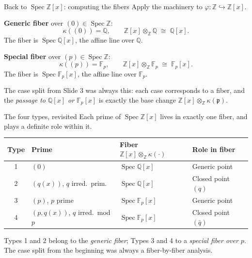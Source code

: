 \documentclass[aspectratio=169,12pt]{beamer}
\begin{document}
\begin{frame}{Back to $\operatorname{Spec}\mathbb{Z}[x]$: computing the fibers}
  Apply the machinery to $\varphi : \mathbb{Z} \hookrightarrow \mathbb{Z}[x]$.

  \bigskip

  \textbf{Generic fiber} over $(0) \in \operatorname{Spec}\mathbb{Z}$:
  \[
    \kappa((0)) = \mathbb{Q},
    \qquad
    \mathbb{Z}[x] \otimes_{\mathbb{Z}} \mathbb{Q} \;\cong\; \mathbb{Q}[x].
  \]
  The fiber is $\operatorname{Spec}\mathbb{Q}[x]$, the affine line over $\mathbb{Q}$.

  \bigskip

  \textbf{Special fiber} over $(p) \in \operatorname{Spec}\mathbb{Z}$:
  \[
    \kappa((p)) = \mathbb{F}_p,
    \qquad
    \mathbb{Z}[x] \otimes_{\mathbb{Z}} \mathbb{F}_p \;\cong\; \mathbb{F}_p[x].
  \]
  The fiber is $\operatorname{Spec}\mathbb{F}_p[x]$, the affine line over $\mathbb{F}_p$.

  \bigskip

  The case split from Slide 3 was always this: each case corresponds to
  a fiber, and the \emph{passage to $\mathbb{Q}[x]$ or $\mathbb{F}_p[x]$} is
  exactly the base change $\mathbb{Z}[x] \otimes_{\mathbb{Z}} \kappa(\mathfrak{p})$.
\end{frame}

\begin{frame}{The four types, revisited}
  Each prime of $\operatorname{Spec}\mathbb{Z}[x]$ lives in exactly one fiber,
  and plays a definite role within it.

  \medskip

  \renewcommand{\arraystretch}{1.55}
  \begin{tabular}{@{\hspace{4pt}}clll@{\hspace{4pt}}}
    \toprule
    \textbf{Type} & \textbf{Prime}
      & \textbf{Fiber $\mathbb{Z}[x]\otimes_{\mathbb{Z}}\kappa(\cdot)$}
      & \textbf{Role in fiber} \\
    \midrule
    1 & $(0)$
      & $\operatorname{Spec}\mathbb{Q}[x]$
      & Generic point \\
    2 & $(q(x))$, $q$ irred.\ prim.
      & $\operatorname{Spec}\mathbb{Q}[x]$
      & Closed point $(q)$ \\
    3 & $(p)$, $p$ prime
      & $\operatorname{Spec}\mathbb{F}_p[x]$
      & Generic point \\
    4 & $(p,q(x))$, $q$ irred.\ mod $p$
      & $\operatorname{Spec}\mathbb{F}_p[x]$
      & Closed point $(\bar{q})$ \\
    \bottomrule
  \end{tabular}

  \medskip

  Types 1 and 2 belong to the \emph{generic fiber};
  Types 3 and 4 to a \emph{special fiber over $p$}.
  The case split from the beginning was always a fiber-by-fiber analysis.
\end{frame}
\end{document}
